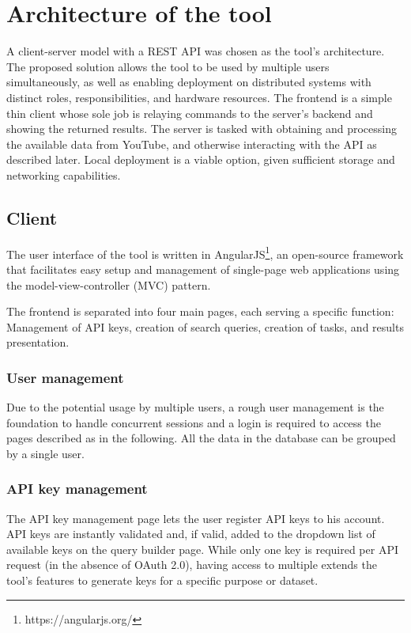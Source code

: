 \section{Architecture of the tool}
A client-server model with a REST API was chosen as the tool's architecture. The
proposed solution allows the tool to be used by multiple users simultaneously,
as well as enabling deployment on distributed systems with distinct roles,
responsibilities, and hardware resources.
The frontend is a simple thin client whose sole job is relaying commands to the
server's backend and showing the returned results. The server is tasked with obtaining
and processing the available data from YouTube, and otherwise interacting with the
API as described later.
Local deployment is a viable option, given sufficient storage and networking
capabilities.


\subsection{Client}
The user interface of the tool is written in
AngularJS\footnote{https://angularjs.org/}, an open-source framework that
facilitates easy setup and management of single-page web applications using the
model-view-controller (MVC) pattern.

The frontend is separated into four main pages, each serving a specific
function: Management of API keys, creation of search queries, creation of tasks,
and results presentation.

\subsubsection{User management}
Due to the potential usage by multiple users, a rough user management is the 
foundation to handle concurrent sessions and a login is required to access the pages
described as in the following. All the data in the database can be grouped by
a single user.

\subsubsection{API key management}
The API key management page lets the user register API keys to his account.
API keys are instantly validated and, if valid, added to the dropdown list of
available keys on the query builder page.
While only one key is required per API request (in the absence of OAuth
2.0), having access to multiple extends the tool's features to generate keys 
for a specific purpose or dataset.

